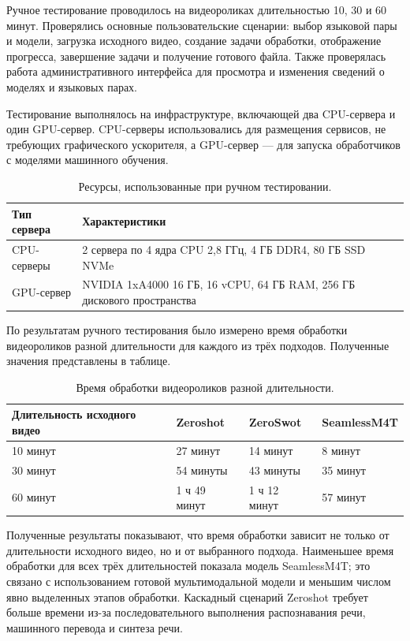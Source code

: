\documentclass[a4paper,article,14pt]{extarticle}
\begin{document}
Ручное тестирование проводилось на видеороликах длительностью 10, 30 и 60 минут. Проверялись основные пользовательские сценарии: выбор языковой пары и модели, загрузка исходного видео, создание задачи обработки, отображение прогресса, завершение задачи и получение готового файла. Также проверялась работа административного интерфейса для просмотра и изменения сведений о моделях и языковых парах.

Тестирование выполнялось на инфраструктуре, включающей два CPU-сервера и один GPU-сервер. CPU-серверы использовались для размещения сервисов, не требующих графического ускорителя, а GPU-сервер --- для запуска обработчиков с моделями машинного обучения.

\begin{table}[H]
\begin{center}
\caption{Ресурсы, использованные при ручном тестировании.}
\begin{tabular}{|p{3.5cm}|p{9.5cm}|}
\hline
Тип сервера & Характеристики\\
\hline
CPU-серверы & 2 сервера по 4 ядра CPU 2,8 ГГц, 4 ГБ DDR4, 80 ГБ SSD NVMe\\
\hline
GPU-сервер & NVIDIA 1xA4000 16 ГБ, 16 vCPU, 64 ГБ RAM, 256 ГБ дискового пространства\\
\hline
\end{tabular}
\end{center}
\end{table}

По результатам ручного тестирования было измерено время обработки видеороликов разной длительности для каждого из трёх подходов. Полученные значения представлены в таблице.

\begin{center}
\begin{longtable}{|p{4cm}|p{3cm}|p{3cm}|p{3cm}|}
\caption{Время обработки видеороликов разной длительности.}\\
\hline
Длительность исходного видео & Zeroshot & ZeroSwot & SeamlessM4T\\
\hline
10 минут & 27 минут & 14 минут & 8 минут\\
\hline
30 минут & 54 минуты & 43 минуты & 35 минут\\
\hline
60 минут & 1 ч 49 минут & 1 ч 12 минут & 57 минут\\
\hline
\end{longtable}
\end{center}

Полученные результаты показывают, что время обработки зависит не только от длительности исходного видео, но и от выбранного подхода. Наименьшее время обработки для всех трёх длительностей показала модель \foreignlanguage{english}{SeamlessM4T}; это связано с использованием готовой мультимодальной модели и меньшим числом явно выделенных этапов обработки. Каскадный сценарий Zeroshot требует больше времени из-за последовательного выполнения распознавания речи, машинного перевода и синтеза речи.
\end{document}
